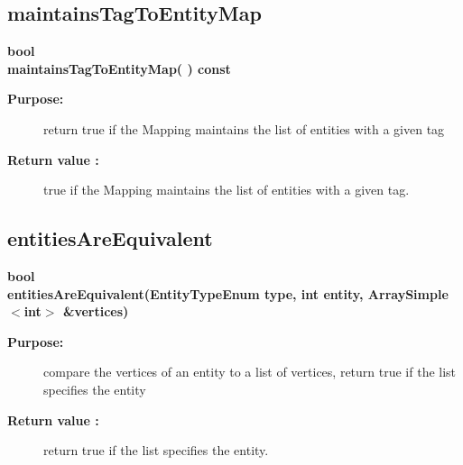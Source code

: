\subsection{maintainsTagToEntityMap}
 
\begin{flushleft} \textbf{%
bool \\ 
\settowidth{\UnstructuredMappingIncludeArgIndent}{maintainsTagToEntityMap(}%
maintainsTagToEntityMap( ) const
}\end{flushleft}
\begin{description}
\item[{\bf Purpose:}]  
    return true if the Mapping maintains the list of entities with a given tag
\item[{\bf Return value :}]  true if the Mapping maintains the list of entities with a given tag.
\end{description}
\subsection{entitiesAreEquivalent}
 
\begin{flushleft} \textbf{%
bool  \\ 
\settowidth{\UnstructuredMappingIncludeArgIndent}{entitiesAreEquivalent(}%
entitiesAreEquivalent(EntityTypeEnum type, int entity, ArraySimple$<$int$>$ \&vertices)
}\end{flushleft}
\begin{description}
\item[{\bf Purpose:}]  
 compare the vertices of an entity to a list of vertices, return true if the list specifies the entity
\item[{\bf Return value :}]  return true if the list specifies the entity.
\end{description}
